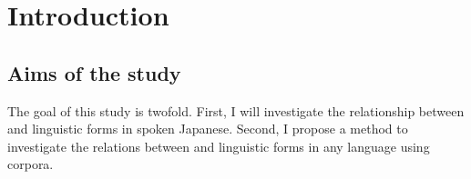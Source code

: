 \chapter{Introduction}\label{Introduction}







\section{Aims of the study}\label{IntroAims}

The goal of this study is twofold.
First,
I will investigate the relationship between  and linguistic forms in spoken Japanese.
Second,
I propose a method to investigate the relations between  and linguistic forms in any language using corpora.

